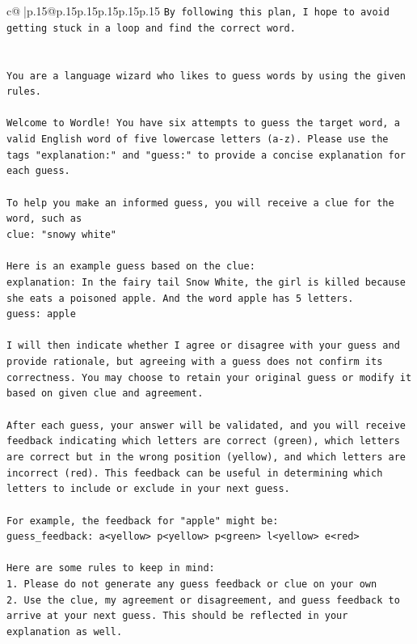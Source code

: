 \documentclass{article}
\begin{document}
{\begin{supertabular}{c@{$\;$}|p{.15\linewidth}@{}p{.15\linewidth}p{.15\linewidth}p{.15\linewidth}p{.15\linewidth}p{.15\linewidth}}
{{{\texttt{By following this plan, I hope to avoid getting stuck in a loop and find the correct word.} \\
\\ 
\\ 
\texttt{You are a language wizard who likes to guess words by using the given rules.} \\
\\ 
\texttt{Welcome to Wordle! You have six attempts to guess the target word, a valid English word of five lowercase letters (a{-}z). Please use the tags "explanation:" and "guess:" to provide a concise explanation for each guess.} \\
\\ 
\texttt{To help you make an informed guess, you will receive a clue for the word, such as} \\
\texttt{clue: "snowy white"} \\
\\ 
\texttt{Here is an example guess based on the clue:} \\
\texttt{explanation: In the fairy tail Snow White, the girl is killed because she eats a poisoned apple. And the word apple has 5 letters.} \\
\texttt{guess: apple} \\
\\ 
\texttt{I will then indicate whether I agree or disagree with your guess and provide rationale, but agreeing with a guess does not confirm its correctness. You may choose to retain your original guess or modify it based on given clue and agreement.} \\
\\ 
\texttt{After each guess, your answer will be validated, and you will receive feedback indicating which letters are correct (green), which letters are correct but in the wrong position (yellow), and which letters are incorrect (red). This feedback can be useful in determining which letters to include or exclude in your next guess.} \\
\\ 
\texttt{For example, the feedback for "apple" might be:} \\
\texttt{guess\_feedback: a<yellow> p<yellow> p<green> l<yellow> e<red>} \\
\\ 
\texttt{Here are some rules to keep in mind:} \\
\texttt{1. Please do not generate any guess feedback or clue on your own} \\
\texttt{2. Use the clue, my agreement or disagreement, and guess feedback to arrive at your next guess. This should be reflected in your explanation as well.} \\
}}}
\end{supertabular}}
\end{document}
